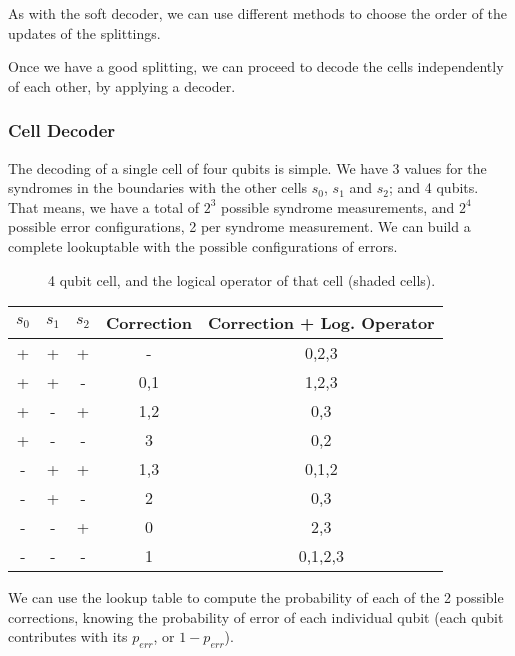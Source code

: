 \documentclass[a4paper,12pt]{article}
\begin{document}
As with the soft decoder, we can use different methods to choose the order of the updates of the splittings.


Once we have a good splitting, we can proceed to decode the cells independently of each other, by applying a decoder.

\subsubsection{Cell Decoder}

The decoding of a single cell of four qubits is simple. We have 3 values for the syndromes in the boundaries with the other cells $s_0$, $s_1$ and $s_2$; and 4 qubits. That means, we have a total of $2^3$ possible syndrome measurements, and $2^4$ possible error configurations, 2 per syndrome measurement. We can build a complete lookuptable with the possible configurations of errors.


\begin{figure}[ht!]
\begin{center}
\caption{4 qubit cell, and the logical operator of that cell (shaded cells).}

\end{center}
\end{figure}
\begin{table}
\begin{center}
\begin{tabular}{|ccc|c|c|}

\hline
$s_0$&$s_1$	&$s_2$&Correction&Correction + Log. Operator\\
\hline
+	&+	&+	&-	&0,2,3	\\
+	&+	&-	&0,1	&1,2,3	\\
+	&-	&+	&1,2	&0,3		\\
+	&-	&-	&3	&0,2		\\
-	&+	&+	&1,3	&0,1,2	\\
-	&+	&-	&2	&0,3		\\
-	&-	&+	&0	&2,3		\\
-	&-	&-	&1	&0,1,2,3	\\
\hline
\end{tabular}
\end{center}
\end{table}

We can use the lookup table to compute the probability of each of the 2 possible corrections, knowing the probability of error of each individual qubit (each qubit contributes with its $p_{err}$, or $1-p_{err}$).
\end{document}

